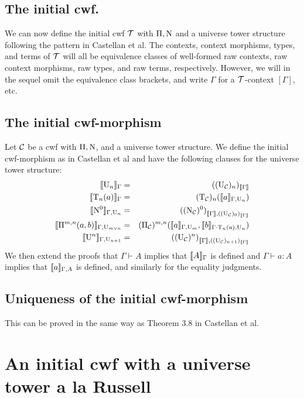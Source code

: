\documentclass{lmcs}
\newcommand{\Ta}{\mathrm{T}}
\newcommand{\Tan}{\Ta_n}
\newcommand{\Un}{\U_n}
\newcommand{\UC}{\U_\C}
\newcommand{\NC}{\N_\C}
\newcommand{\PiC}{\Pi_\C}
\begin{document}
\subsection{The initial cwf.}
We can now define the initial cwf ${\mathcal T}$ with $\Pi, \mathrm{N}$ and a universe tower structure following the pattern in Castellan et al. The contexts, context morphisms, types, and terms of ${\mathcal T}$ will all be equivalence classes of well-formed raw contexts, raw context morphisms, raw types, and raw terms, respectively. However, we will in the sequel omit the equivalence class brackets, and write $\Gamma$ for a ${\mathcal T}$-context $[\Gamma]$, etc.

\subsection{The initial cwf-morphism} Let ${\mathcal C}$ be a cwf with $\Pi, \mathrm{N}$, and a universe tower structure. We define the initial cwf-morphism as in Castellan et al and have the following clauses for the universe tower structure:
\begin{eqnarray*}
\inte{\Un}_\Gamma &=& ((\UC)_n)_{\inte{\Gamma}}\\
\inte{\Tan(a)}_\Gamma &= & (\Ta_\C)_n(\inte{a}_{\Gamma,\Un})\\
\inte{\N^0}_{\Gamma,\Un} &=&  {({({\NC})^0})}_{\inte{\Gamma},((\UC)_0)_{\inte{\Gamma}}}\\
\inte{\Pi^{m,n}(a,b)}_{\Gamma,\U_{m \vee n}} &=&  (\PiC)^{m,n}(\inte{a}_{\Gamma,\U_m},\inte{b}_{\Gamma \cdot \Tan(a),\Un})\\
\inte{\U^n}_{\Gamma,\U_{n+1}} &=&  {({({\UC})^n})}_{\inte{\Gamma},((\UC)_{n+1})_{\inte{\Gamma}}}%
\end{eqnarray*}
We then extend the proofs that $\Gamma \vdash A$ implies that $\llbracket A \rrbracket_\Gamma$ is defined and $\Gamma \vdash a : A$ implies that $\llbracket a \rrbracket_{\Gamma,A}$ is defined, and similarly for the equality judgments. 

\subsection{Uniqueness of the initial cwf-morphism} This can be proved in the same way as Theorem 3.8 in Castellan et al.

\section{An initial cwf with a universe tower a la Russell}
\end{document}

